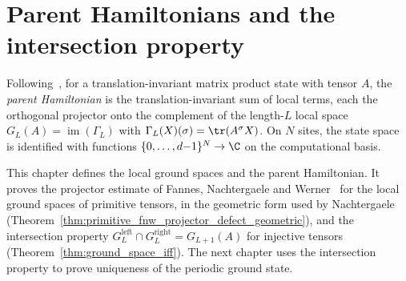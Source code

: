 \chapter{Parent Hamiltonians and the intersection property}\label{ch:parent_hamiltonian}

Following~\cite{PerezGarcia2007Matrix,Cirac2021Matrix}, for a
translation-invariant matrix product state with tensor $A$, the \emph{parent
    Hamiltonian} is the translation-invariant sum of local terms, each the
orthogonal projector onto the complement of the length-$L$ local space
$G_L(A)=\operatorname{im}(\Gamma_L)$ with
$\Gamma_L(X)(\sigma)=\tr(A^\sigma X)$. On $N$ sites, the state space is
identified with functions $\{0,\ldots,d{-}1\}^N\to\C$ on the computational
basis.

This chapter defines the local ground spaces and the parent Hamiltonian. It
proves the projector estimate of Fannes, Nachtergaele and
Werner~\cite{Fannes1992Finitely} for the local ground spaces of primitive
tensors, in the geometric form used by Nachtergaele~\cite{Nachtergaele1996Spectral}
(Theorem~\ref{thm:primitive_fnw_projector_defect_geometric}), and the
intersection property
$G_L^{\mathrm{left}}\cap G_L^{\mathrm{right}}=G_{L+1}(A)$ for injective
tensors (Theorem~\ref{thm:ground_space_iff}). The next chapter uses the intersection property to prove uniqueness of the periodic ground state.


